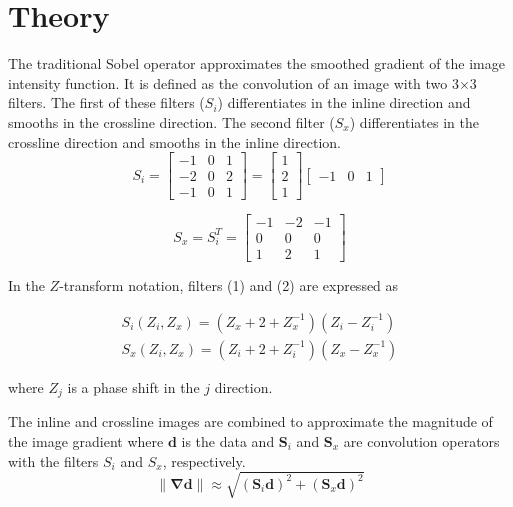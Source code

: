 \section{Theory}
The traditional Sobel operator approximates the smoothed gradient of the image intensity function. 
It is defined as the convolution of an image with two 3$\times$3 filters.
The first of these filters ($S_i$) differentiates in the inline direction and smooths in the crossline direction.
The second filter ($S_x$) differentiates in the crossline direction and smooths in the inline direction.
\begin{equation}
S_i=\left[
\begin{array}{rrr}
-1 & 0 & 1 \\
-2 & 0 & 2 \\
-1 & 0 & 1
\end{array}
\right]=\left[
\begin{array}{c}
1 \\
2 \\
1
\end{array}
\right]\left[
\begin{array}{ccc}
-1 & 0 & 1
\end{array}
\right]
\end{equation}

\begin{equation}
S_x=S_i^T=\left[
\begin{array}{rrr}
-1 & -2 & -1 \\
0 & 0 & 0 \\
1 & 2 & 1
\end{array}
\right]
\end{equation}

In the $Z$-transform notation, filters (1) and (2) are expressed as

\begin{equation}
\begin{array}{l}
S_i(Z_i,Z_x)=(Z_x+2+Z_x^{-1})(Z_i-Z_i^{-1}) \\
S_x(Z_i,Z_x)=(Z_i+2+Z_i^{-1})(Z_x-Z_x^{-1})
\end{array}
\end{equation}

where $Z_j$ is a phase shift in the $j$ direction.

The inline and crossline images are combined to approximate the magnitude of the image gradient \cite[]{chopra07} where $\mathbf{d}$ is the data and $\mathbf{S}_i$ and $\mathbf{S}_x$ are convolution operators with the filters $S_i$ and $S_x$, respectively.
\begin{equation}
\|\mathbf{\nabla}\mathbf{d}\|\approx \sqrt{(\mathbf{S}_i\mathbf{d})^2+(\mathbf{S}_x\mathbf{d})^2}
\end{equation}

